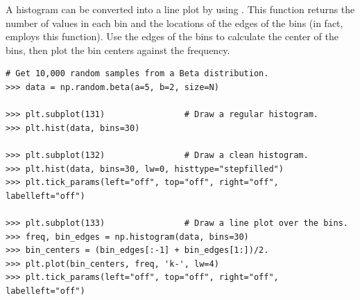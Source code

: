 A histogram can be converted into a line plot by using .
This function returns the number of values in each bin and the locations of the edges of the bins (in fact,  employs this function).
Use the edges of the bins to calculate the center of the bins, then plot the bin centers against the frequency.

\begin{lstlisting}
# Get 10,000 random samples from a Beta distribution.
>>> data = np.random.beta(a=5, b=2, size=N)

>>> plt.subplot(131)                # Draw a regular histogram.
>>> plt.hist(data, bins=30)

>>> plt.subplot(132)                # Draw a clean histogram.
>>> plt.hist(data, bins=30, lw=0, histtype="stepfilled")
>>> plt.tick_params(left="off", top="off", right="off", labelleft="off")

>>> plt.subplot(133)                # Draw a line plot over the bins.
>>> freq, bin_edges = np.histogram(data, bins=30)
>>> bin_centers = (bin_edges[:-1] + bin_edges[1:])/2.
>>> plt.plot(bin_centers, freq, 'k-', lw=4)
>>> plt.tick_params(left="off", top="off", right="off", labelleft="off")
\end{lstlisting}

